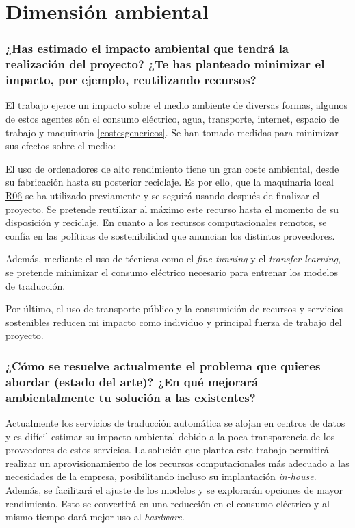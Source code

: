\section{Dimensión ambiental}
\subsubsection{¿Has estimado el impacto ambiental que tendrá la realización del proyecto? ¿Te has
planteado minimizar el impacto, por ejemplo, reutilizando recursos?}

El trabajo ejerce un impacto sobre el medio ambiente de diversas formas, algunos de estos
agentes són el consumo eléctrico, agua, transporte, internet, espacio de trabajo y maquinaria \ref{costesgenericos}.
Se han tomado medidas para minimizar sus efectos sobre el medio:

El uso de ordenadores de alto rendimiento tiene un gran coste ambiental,
desde su fabricación hasta su posterior reciclaje. Es por ello, que la maquinaria
local \hyperref[R06]{R06} se ha utilizado previamente y se seguirá usando después de
finalizar el proyecto. Se pretende reutilizar al máximo este recurso hasta el
momento de su disposición y reciclaje.
En cuanto a los recursos computacionales remotos, se confía en las políticas de sostenibilidad
\cite{awssustainability} que anuncian los distintos proveedores.

Además, mediante el uso de técnicas como el \textit{fine-tunning} y el
\textit{transfer learning}, se pretende minimizar el consumo eléctrico necesario para
entrenar los modelos de traducción.

Por último, el uso de transporte público y la consumición de recursos y servicios sostenibles
reducen mi impacto como individuo y principal fuerza de trabajo del proyecto. 

\subsubsection{¿Cómo se resuelve actualmente el problema que quieres abordar (estado del arte)?
¿En qué mejorará ambientalmente tu solución a las existentes?}

Actualmente los servicios de traducción automática se alojan en centros de datos y
es difícil estimar su impacto ambiental debido a la poca transparencia de los proveedores
de estos servicios. La solución que plantea este trabajo permitirá realizar un aprovisionamiento
de los recursos computacionales más adecuado a las necesidades de la empresa, posibilitando incluso
su implantación \textit{in-house}. Además, se facilitará el ajuste de los modelos y se
explorarán opciones de mayor rendimiento.
Esto se convertirá en una reducción en el consumo eléctrico y al mismo tiempo dará mejor uso al
\textit{hardware}.


